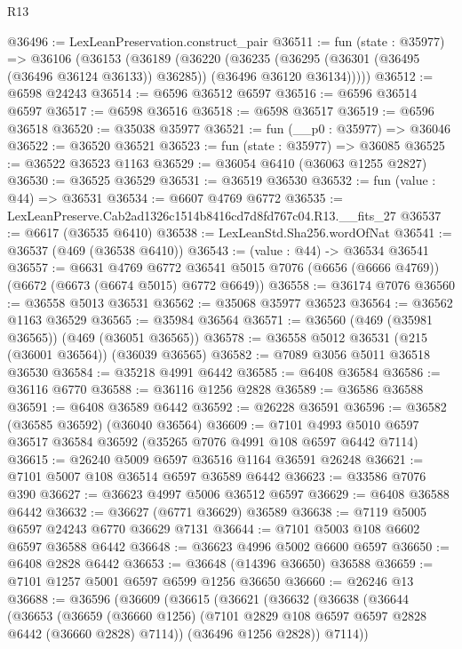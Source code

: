 \begin{lexlean}{R13}
\begin{coremodule}
@36496 := LexLeanPreservation.construct_pair
@36511 := fun (state : @35977) =>
  @36106
    (@36153
      (@36189
        (@36220
          (@36235
            (@36295 (@36301 (@36495 (@36496 @36124 @36133)) @36285))
            (@36496 @36120 @36134)))))
@36512 := @6598 @24243
@36514 := @6596 @36512 @6597
@36516 := @6596 @36514 @6597
@36517 := @6598 @36516
@36518 := @6598 @36517
@36519 := @6596 @36518
@36520 := @35038 @35977
@36521 := fun (__p0 : @35977) => @36046
@36522 := @36520 @36521
@36523 := fun (state : @35977) => @36085
@36525 := @36522 @36523 @1163
@36529 := @36054 @6410 (@36063 @1255 @2827)
@36530 := @36525 @36529
@36531 := @36519 @36530
@36532 := fun (value : @44) => @36531
@36534 := @6607 @4769 @6772
@36535 := LexLeanPreserve.Cab2ad1326c1514b8416cd7d8fd767c04.R13.__fits_27
@36537 := @6617 (@36535 @6410)
@36538 := LexLeanStd.Sha256.wordOfNat
@36541 := @36537 (@469 (@36538 @6410))
@36543 := (value : @44) -> @36534 @36541
@36557 := @6631
    @4769
    @6772
    @36541
    @5015
    @7076
    (@6656 (@6666 @4769))
    (@6672 (@6673 (@6674 @5015) @6772 @6649))
@36558 := @36174 @7076
@36560 := @36558 @5013 @36531
@36562 := @35068 @35977 @36523
@36564 := @36562 @1163 @36529
@36565 := @35984 @36564
@36571 := @36560 (@469 (@35981 @36565)) (@469 (@36051 @36565))
@36578 := @36558 @5012 @36531 (@215 (@36001 @36564)) (@36039 @36565)
@36582 := @7089 @3056 @5011 @36518 @36530
@36584 := @35218 @4991 @6442
@36585 := @6408 @36584
@36586 := @36116 @6770
@36588 := @36116 @1256 @2828
@36589 := @36586 @36588
@36591 := @6408 @36589 @6442
@36592 := @26228 @36591
@36596 := @36582 (@36585 @36592) (@36040 @36564)
@36609 := @7101 @4993 @5010 @6597 @36517 @36584 @36592 (@35265 @7076 @4991 @108 @6597 @6442 @7114)
@36615 := @26240 @5009 @6597 @36516 @1164 @36591 @26248
@36621 := @7101 @5007 @108 @36514 @6597 @36589 @6442
@36623 := @33586 @7076 @390
@36627 := @36623 @4997 @5006 @36512 @6597
@36629 := @6408 @36588 @6442
@36632 := @36627 (@6771 @36629) @36589
@36638 := @7119 @5005 @6597 @24243 @6770 @36629 @7131
@36644 := @7101 @5003 @108 @6602 @6597 @36588 @6442
@36648 := @36623 @4996 @5002 @6600 @6597
@36650 := @6408 @2828 @6442
@36653 := @36648 (@14396 @36650) @36588
@36659 := @7101 @1257 @5001 @6597 @6599 @1256 @36650
@36660 := @26246 @13
@36688 := @36596
    (@36609
      (@36615
        (@36621
          (@36632
            (@36638
              (@36644
                (@36653
                  (@36659
                    (@36660 @1256)
                    (@7101 @2829 @108 @6597 @6597 @2828 @6442 (@36660 @2828) @7114))
                  (@36496 @1256 @2828))
                @7114))

\end{coremodule}
\end{lexlean}
